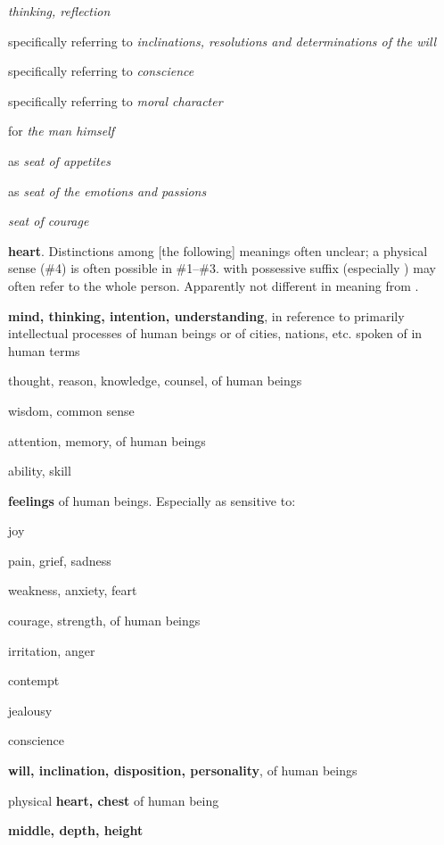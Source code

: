 \begin{compactdesc}
\begin{compactitem}
							\item[II.3.c] \textit{thinking, reflection}
							\item[II.4] specifically referring to \textit{inclinations, resolutions and determinations of the will}
							\item[II.5] specifically referring to \textit{conscience}
							\item[II.6] specifically referring to \textit{moral character}
							\item[II.7] for \textit{the man himself}
							\item[II.8] as \textit{seat of appetites}
							\item[II.9] as \textit{seat of the emotions and passions}
							\item[II.10] \textit{seat of courage}
						\end{compactitem}
					\item[DCH PDF 2056] \textbf{heart}. Distinctions among [the following] meanings often unclear; a physical sense (\#4) is often possible in \#1--\#3.  with possessive suffix (especially ) may often refer to the whole person. Apparently not different in meaning from .
						\begin{compactitem}
							\item[1] \textbf{mind, thinking, intention, understanding}, in reference to primarily intellectual processes of human beings or of cities, nations, etc. spoken of in human terms
							\item[1.a] thought, reason, knowledge, counsel, of human beings
							\item[1.b] wisdom, common sense
							\item[1.c] attention, memory, of human beings
							\item[1.d] ability, skill
							\item[2] \textbf{feelings} of human beings. Especially as sensitive to:
							\item[2.a] joy
							\item[2.b] pain, grief, sadness
							\item[2.c] weakness, anxiety, feart
							\item[2.d] courage, strength, of human beings
							\item[2.e] irritation, anger
							\item[2.f] contempt
							\item[2.g] jealousy
							\item[2.h] conscience
							\item[3] \textbf{will, inclination, disposition, personality}, of human beings
							\item[4] physical \textbf{heart, chest} of human being
							\item[5] \textbf{middle, depth, height}
						\end{compactitem}
				\end{compactdesc}
				
